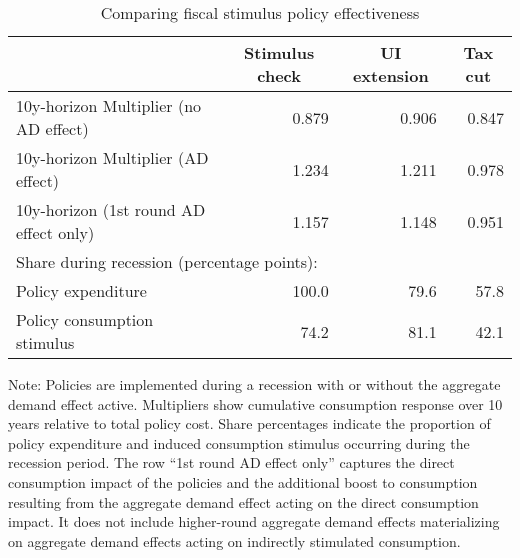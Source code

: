 \documentclass{econsocart}
\begin{document}
\begin{table}[tb] 
  \caption{Comparing fiscal stimulus policy effectiveness}
  \label{tab:Multiplier} 
  \centering

  \begin{tabular*}
    {\textwidth}{@{\extracolsep{\fill}}lrrr@{}} 
    \hline
    & \multicolumn{1}{c}{Stimulus check} & \multicolumn{1}{c}{UI extension} & \multicolumn{1}{c}{Tax cut} \\ \hline
    10y-horizon Multiplier (no AD effect)      & 0.879 & 0.906 & 0.847 \\
    10y-horizon Multiplier (AD effect)         & 1.234 & 1.211 & 0.978 \\
    10y-horizon (1st round AD effect only)     & 1.157 & 1.148 & 0.951 \\
    \hline
    \multicolumn{4}{l}{Share during recession (percentage points):} \\
    Policy expenditure                          & 100.0 &  79.6 &  57.8 \\
    Policy consumption stimulus                 &  74.2 &  81.1 &  42.1 \\
    \hline
  \end{tabular*}

  \noindent\parbox{\textwidth}{
    \medskip
    \footnotesize Note: Policies are implemented during a recession with or without the aggregate demand effect active. Multipliers show cumulative consumption response over 10 years relative to total policy cost. Share percentages indicate the proportion of policy expenditure and induced consumption stimulus occurring during the recession period. The row ``1st round AD effect only'' captures the direct consumption impact of the policies and the additional boost to consumption resulting from the aggregate demand effect acting on the direct consumption impact. It does not include higher-round aggregate demand effects materializing on aggregate demand effects acting on indirectly stimulated consumption.
  }
\end{table}

\vspace{0.5em}
\end{document}
